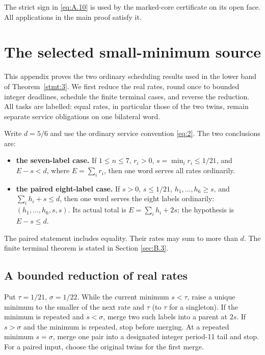 \documentclass[11pt,a4paper]{article}
\providecommand{\tightlist}{\setlength{\itemsep}{0pt}\setlength{\parskip}{0pt}}
\begin{document}
The strict sign in \eqref{eq:A.10} is used by the marked-core certificate on its open face. All applications in the main proof satisfy it.

\section{The selected small-minimum source}\label{sec:B}

This appendix proves the two ordinary scheduling results used in the lower band of Theorem~\ref{stmt:3}. We first reduce the real rates, round once to bounded integer deadlines, schedule the finite terminal cases, and reverse the reduction. All tasks are labelled: equal rates, in particular those of the two twins, remain separate service obligations on one bilateral word.

Write \(d=5/6\) and use the ordinary service convention \eqref{eq:2}. The two conclusions are:

\begin{itemize}
\tightlist
\item
  \textbf{the seven-label case.} If \(1\le n\le7\), \(r_i>0\), \(s=\min_i r_i\le1/21\), and \(E-s<d\), where \(E=\sum_i r_i\), then one word serves all rates ordinarily.
\item
  \textbf{the paired eight-label case.} If \(s>0\), \(s\le1/21\), \(h_1,\ldots,h_6\ge s\), and \(\sum_i h_i+s\le d\), then one word serves the eight labels ordinarily: \((h_1,\ldots,h_6,s,s)\). Its actual total is \(E=\sum_i h_i+2s\); the hypothesis is \(E-s\le d\).
\end{itemize}

The paired statement includes equality. Their rates may sum to more than \(d\). The finite terminal theorem is stated in Section \ref{sec:B.3}.

\subsection{A bounded reduction of real rates}\label{sec:B.1}

Put \(\tau=1/21\), \(\sigma=1/22\). While the current minimum \(s<\tau\), raise a unique minimum to the smaller of the next rate and \(\tau\) (to \(\tau\) for a singleton). If the minimum is repeated and \(s<\sigma\), merge two such labels into a parent at \(2s\). If \(s>\sigma\) and the minimum is repeated, stop before merging. At a repeated minimum \(s=\sigma\), merge one pair into a designated integer period-11 tail and stop. For a paired input, choose the original twins for the first merge.
\end{document}
